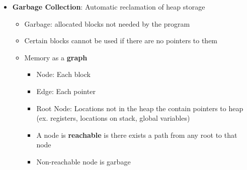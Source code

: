 \documentclass[12pt]{article}
\begin{document}
{\begin{itemize}
\begin{itemize}
		\begin{itemize}
			\item Search for free block in the appropriate free list
			\item If block found, split and place fragment on appropriate list (optional)
			\item If not found, keep searching next larger class of free list
			\item Still not found: request additional heap memory (call \texttt{sbrk}), allocate into the new memory and insert remaining block into appropriate size class
			\item Freeing: Free and coalesce, insert into appropriate size class
		\end{itemize}
		\item \textbf{Advantages}
		\begin{itemize}
			\item Higher throughput ($\log$ time for $2^k$ size classes)
			\item Better memory utilization
			\begin{itemize}
				\item First-fit search $\approx$ best-fit search of entire heap
				\item Extreme case: Giving each block its own size class is equivalent to best-fit
			\end{itemize}
		\end{itemize}
	\end{itemize}
	\item \textbf{Garbage Collection}: Automatic reclamation of heap storage
	\begin{itemize}
		\item Garbage: allocated blocks not needed by the program
		\item Certain blocks cannot be used if there are no pointers to them
		\item Memory as a \textbf{graph}
		\begin{itemize}
			\item Node: Each block
			\item Edge: Each pointer
			\item Root Node: Locations not in the heap the contain pointers to heap (ex. registers, locations on stack, global variables)
			\item A node is \textbf{reachable} is there exists a path from any root to that node
			\item Non-reachable node is garbage
		\end{itemize}

\end{itemize}
\end{itemize}}
\end{document}
